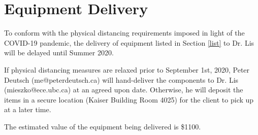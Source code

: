 \documentclass[10pt,letterpaper]{article}
\begin{document}
\section{Equipment Delivery}
To conform with the physical distancing requirements imposed in light of the COVID-19 pandemic, the delivery of equipment listed in Section \ref{list} to Dr. Lis will be delayed until Summer 2020. 

If physical distancing measures are relaxed prior to September 1st, 2020, Peter Deutsch (me@peterdeutsch.ca) will hand-deliver the components to Dr. Lis (mieszko@ece.ubc.ca) at an agreed upon date. Otherwise, he will deposit the items in a secure location (Kaiser Building Room 4025) for the client to pick up at a later time. 

The estimated value of the equipment being delivered is \$1100.

\end{document}
